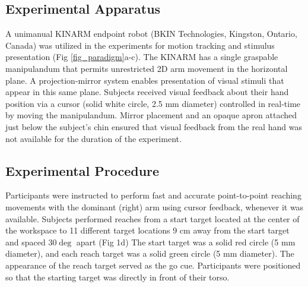 \documentclass[man, 11pt, longtable, floatsintext, notab]{apa6}
\begin{document}
\subsection{Experimental Apparatus}
A unimanual KINARM endpoint robot (BKIN Technologies,
Kingston, Ontario, Canada) was utilized in the experiments
for motion tracking and stimulus presentation (Fig
\ref{fig_paradigm}a-c). The KINARM has a single graspable
manipulandum that permits unrestricted 2D arm movement in
the horizontal plane. A projection-mirror system enables
presentation of visual stimuli that appear in this same
plane. Subjects received visual feedback about their hand
position via a cursor (solid white circle, 2.5 mm diameter)
controlled in real-time by moving the manipulandum. Mirror
placement and an opaque apron attached just below the
subject’s chin ensured that visual feedback from the real
hand was not available for the duration of the experiment.

\subsection{Experimental Procedure}
Participants were instructed to perform fast and accurate
point-to-point reaching movements with the dominant (right)
arm using cursor feedback, whenever it was available.
Subjects performed reaches from a start target located at
the center of the workspace to 11 different target locations
9 cm away from the start target and spaced $30\deg$ apart
(Fig 1d) The start target was a solid red circle (5 mm
diameter), and each reach target was a solid green circle (5
mm diameter). The appearance of the reach target served as
the go cue. Participants were positioned so that the
starting target was directly in front of their torso.
\end{document}

